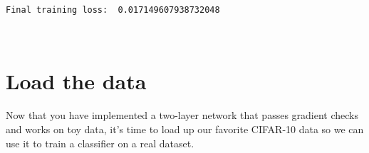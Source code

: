 \documentclass[11pt]{article}
\begin{document}
    \begin{Verbatim}[commandchars=\\\{\}]
Final training loss:  0.017149607938732048
    \end{Verbatim}

    \begin{center}
    \end{center}
    { \hspace*{\fill} \\}
    
    \hypertarget{load-the-data}{%
\section{Load the data}\label{load-the-data}}

Now that you have implemented a two-layer network that passes gradient
checks and works on toy data, it's time to load up our favorite CIFAR-10
data so we can use it to train a classifier on a real dataset.
\end{document}
